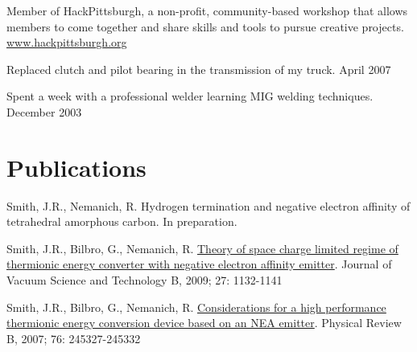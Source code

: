 \documentclass[letterpaper,margin,line]{res}
\begin{document}
\begin{resume}
\vspace{-.3cm}
Member of HackPittsburgh, a non-profit, community-based workshop that allows members to come together and share skills and tools to pursue creative projects. \href{http://www.hackpittsburgh.org}{www.hackpittsburgh.org}

\vspace{-.3cm}
Replaced clutch and pilot bearing in the transmission of my truck. April 2007

\vspace{-.3cm}
Spent a week with a professional welder learning MIG welding techniques. December 2003


% 


\section{\sc Publications}
Smith, J.R., Nemanich, R. Hydrogen termination and negative electron affinity of tetrahedral amorphous carbon. In preparation.

Smith, J.R., Bilbro, G., Nemanich, R. \href{http://dx.doi.org/10.1116/1.3125282}{Theory of space charge limited regime of thermionic energy converter with negative electron affinity emitter}. Journal of Vacuum Science and Technology B, 2009; 27: 1132-1141

Smith, J.R., Bilbro, G., Nemanich, R. \href{http://dx.doi.org/10.1103/PhysRevB.76.245327}{Considerations for a high performance thermionic energy conversion device based on an NEA emitter}. Physical Review B, 2007; 76: 245327-245332


\end{resume}
\end{document}
